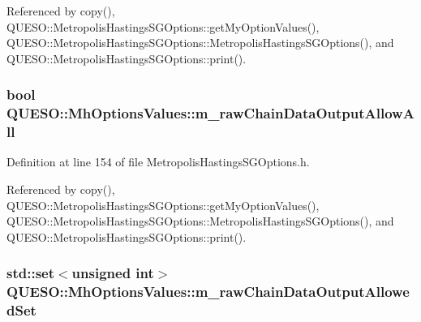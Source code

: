 Referenced by copy(), Q\-U\-E\-S\-O\-::\-Metropolis\-Hastings\-S\-G\-Options\-::get\-My\-Option\-Values(), Q\-U\-E\-S\-O\-::\-Metropolis\-Hastings\-S\-G\-Options\-::\-Metropolis\-Hastings\-S\-G\-Options(), and Q\-U\-E\-S\-O\-::\-Metropolis\-Hastings\-S\-G\-Options\-::print().

\hypertarget{class_q_u_e_s_o_1_1_mh_options_values_a7bd5a3926443946479ea617918d6723f}{
\subsubsection[{m\-\_\-raw\-Chain\-Data\-Output\-Allow\-All}]{\setlength{\rightskip}{0pt plus 5cm}bool Q\-U\-E\-S\-O\-::\-Mh\-Options\-Values\-::m\-\_\-raw\-Chain\-Data\-Output\-Allow\-All}}\label{class_q_u_e_s_o_1_1_mh_options_values_a7bd5a3926443946479ea617918d6723f}


Definition at line 154 of file Metropolis\-Hastings\-S\-G\-Options.\-h.



Referenced by copy(), Q\-U\-E\-S\-O\-::\-Metropolis\-Hastings\-S\-G\-Options\-::get\-My\-Option\-Values(), Q\-U\-E\-S\-O\-::\-Metropolis\-Hastings\-S\-G\-Options\-::\-Metropolis\-Hastings\-S\-G\-Options(), and Q\-U\-E\-S\-O\-::\-Metropolis\-Hastings\-S\-G\-Options\-::print().

\hypertarget{class_q_u_e_s_o_1_1_mh_options_values_a99f722385d57bcb24542f3969c3764cd}{
\subsubsection[{m\-\_\-raw\-Chain\-Data\-Output\-Allowed\-Set}]{\setlength{\rightskip}{0pt plus 5cm}std\-::set$<$unsigned int$>$ Q\-U\-E\-S\-O\-::\-Mh\-Options\-Values\-::m\-\_\-raw\-Chain\-Data\-Output\-Allowed\-Set}}\label{class_q_u_e_s_o_1_1_mh_options_values_a99f722385d57bcb24542f3969c3764cd}


